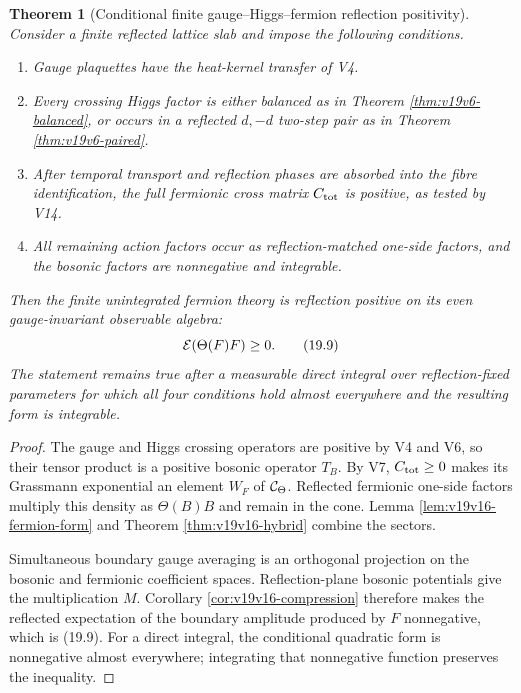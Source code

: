 \documentclass[11pt]{article}
\newtheorem{theorem}{Theorem}[section]
\theoremstyle{remark}
\begin{document}
\begin{theorem}[Conditional finite gauge--Higgs--fermion reflection
positivity]
\label{thm:v19v16-coupled}
Consider a finite reflected lattice slab and impose the following
conditions.
\begin{enumerate}
 \item Gauge plaquettes have the heat-kernel transfer of V4.
 \item Every crossing Higgs factor is either balanced as in Theorem
       \ref{thm:v19v6-balanced}, or occurs in a reflected \(d,-d\)
       two-step pair as in Theorem \ref{thm:v19v6-paired}.
 \item After temporal transport and reflection phases are absorbed into
       the fibre identification, the full fermionic cross matrix
       \(C_{\rm tot}\) is positive, as tested by V14.
 \item All remaining action factors occur as reflection-matched one-side
       factors, and the bosonic factors are nonnegative and integrable.
\end{enumerate}
Then the finite unintegrated fermion theory is reflection positive on its
even gauge-invariant observable algebra:
\[
 {\cal E}\!\left(\Theta(F)F\right)\geq0.                       \tag{19.9}
\]
The statement remains true after a measurable direct integral over
reflection-fixed parameters for which all four conditions hold almost
everywhere and the resulting form is integrable.
\end{theorem}

\begin{proof}
The gauge and Higgs crossing operators are positive by V4 and V6, so their
tensor product is a positive bosonic operator \(T_B\).  By V7,
\(C_{\rm tot}\geq0\) makes its Grassmann exponential an element \(W_F\) of
\({\cal C}_\Theta\).  Reflected fermionic one-side factors multiply this
density as \(\Theta(B)B\) and remain in the cone.  Lemma
\ref{lem:v19v16-fermion-form} and Theorem \ref{thm:v19v16-hybrid} combine
the sectors.

Simultaneous boundary gauge averaging is an orthogonal projection on the
bosonic and fermionic coefficient spaces.  Reflection-plane bosonic
potentials give the multiplication \(M\).  Corollary
\ref{cor:v19v16-compression} therefore makes the reflected expectation of
the boundary amplitude produced by \(F\) nonnegative, which is (19.9).
For a direct integral, the conditional quadratic form is nonnegative
almost everywhere; integrating that nonnegative function preserves the
inequality.
\end{proof}
\end{document}
